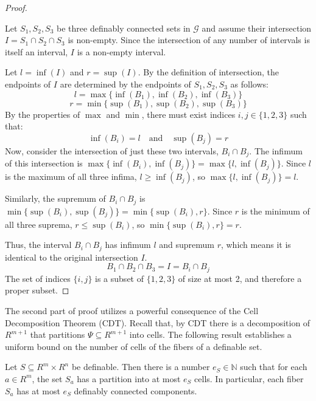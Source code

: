 \begin{proof}{\label{lem:o-minimality-application-1}}

    Let $S_1, S_2, S_3$ be three definably connected sets in $\mathcal{G}$ and assume their intersection $I = S_1 \cap S_2 \cap S_3$ is non-empty. Since the intersection of any number of intervals is itself an interval, $I$ is a non-empty interval.

    Let $l = \inf(I)$ and $r = \sup(I)$. By the definition of intersection, the endpoints of $I$ are determined by the endpoints of $S_1, S_2, S_3$ as follows:
    $$ l = \max\{\inf(B_1), \inf(B_2), \inf(B_3)\} $$
    $$ r = \min\{\sup(B_1), \sup(B_2), \sup(B_3)\} $$
    By the properties of $\max$ and $\min$, there must exist indices $i, j \in \{1, 2, 3\}$ such that:
    $$ \inf(B_i) = l \quad \text{and} \quad \sup(B_j) = r $$
    Now, consider the intersection of just these two intervals, $B_i \cap B_j$. The infimum of this intersection is $\max\{\inf(B_i), \inf(B_j)\} = \max\{l, \inf(B_j)\}$. Since $l$ is the maximum of all three infima, $l \ge \inf(B_j)$, so $\max\{l, \inf(B_j)\} = l$.

    Similarly, the supremum of $B_i \cap B_j$ is $\min\{\sup(B_i), \sup(B_j)\} = \min\{\sup(B_i), r\}$. Since $r$ is the minimum of all three suprema, $r \le \sup(B_i)$, so $\min\{\sup(B_i), r\} = r$.

    Thus, the interval $B_i \cap B_j$ has infimum $l$ and supremum $r$, which means it is identical to the original intersection $I$.
    $$ B_1 \cap B_2 \cap B_3 = I = B_i \cap B_j $$
    The set of indices $\{i, j\}$ is a subset of $\{1, 2, 3\}$ of size at most 2, and therefore a proper subset.
\end{proof}

The second part of proof utilizes a powerful consequence of the Cell Decomposition Theorem (CDT). Recall that, by CDT there is a decomposition of $R^{m+1}$ that partitions $\Psi \subseteq R^{m+1}$ into cells. The following result establishes a uniform bound on the number of cells of the fibers of a definable set.

\begin{lemma}{\label{lem:o-minimality-application-2}}
    Let $S \subseteq R^m \times R^n$ be definable. Then there is a number $e_S \in \mathbb{N}$ such that for each $a \in R^m$, the set $S_a$ has a partition into at most $e_S$ cells. In particular, each fiber $S_a$ has at most $e_S$ definably connected components.
\end{lemma}


